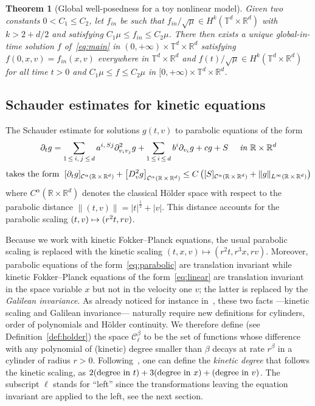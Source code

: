 \documentclass[10pt]{amsart}
\newtheorem{theo}{Theorem}[section]
\theoremstyle{definition}\newtheorem{defi}[theo]{Definition}\newtheorem{rema}[theo]{Remark}\newtheorem{exam}[theo]{Example}\newtheorem{exem}[theo]{Example}\newtheorem{nota}[theo]{Notation}
\newcommand{\R}{\mathbb{R}}
\newcommand{\T}{\mathbb{T}}
\newcommand{\cC}{\mathcal{C}}
\begin{document}
\begin{theo}[Global well-posedness for a toy nonlinear
model]\label{theo:main-holder}
Given two constants $0<C_1\le C_2$, let $f_{in}$ be such that $f_{in}/\sqrt{\mu} \in H^k(\T^d \times \R^{d})$ with $k > 2+d/2$ and satisfying $ C_1 \mu \le f_{in} \le C_2 \mu$. There then exists a unique global-in-time solution $f$ of~\eqref{eq:main} in $(0,+\infty) \times \T^d \times \R^d$ satisfying $f(0,x,v) = f_{in} (x,v)$ everywhere in $\T^d \times \R^{d}$ and $f(t)/\sqrt{\mu} \in H^k(\T^d \times \R^{d})$ for all time $t>0$ and $C_1 \mu \le f \le C_2 \mu$ in $[0,+\infty) \times \T^d \times \R^d$.
\end{theo}


\subsection{Schauder estimates for kinetic equations}

The Schauder estimate for solutions $g(t,v)$ to parabolic equations of the form
\begin{multline}\label{eq:parabolic}
\partial_t g =
\sum_{1\,\le\:i,\,j\:\le\,d} a^{i,\,Sj} \partial^2_{v_iv_j} g +
\sum_{1\,\le\,i\,\le\,d}b^i \partial_{v_i} g + c g + S \quad \emph{ in } \R \times \R^d \\[1ex]
\text{takes the form } \; [\partial_t g]_{\cC^{\alpha}\left(\R\,\times\,\R^d\right)} + \left[D^2_v g\right]_{\cC^\alpha\left(\R\,\times\,\R^d\right)} \le C
\left([S]_{\cC^\alpha\left(\R\,\times\,\R^d\right)} + \|g\|_{L^\infty\left(\R\,\times\,\R^d\right)} \right)
\end{multline}
where $C^\alpha (\R \times \R^d)$ denotes the classical H\"older space with respect to the parabolic distance $\|(t,v)\|=|t|^{\frac12} + |v|$. This distance accounts for the parabolic scaling $(t,v)\linebreak\mapsto (r^2t,rv)$.

Because we work with kinetic Fokker--Planck equations, the usual parabolic scaling is replaced with the kinetic scaling $(t,x,v) \mapsto (r^2t,r^3x,rv)$. Moreover, parabolic equations of the form~\eqref{eq:parabolic} are translation invariant while kinetic Fokker--Planck equations of the form~\eqref{eq:linear} are translation invariant in the space variable $x$ but not in the velocity one $v$; the latter is replaced by the \emph{Galilean invariance}. As already noticed for instance in~\cite{gimv,polidoro1994}, these two facts ---kinetic scaling and Galilean invariance--- naturally require new definitions for cylinders, order of polynomials and H\"older continuity. We therefore define (see Definition~\ref{def:holder}) the space $\cC^\beta_\ell$ to be the set of functions whose difference with any polynomial of (kinetic) degree smaller than $\beta$ decays at rate $r^\beta$ in a cylinder of radius $r>0$. Following~\cite{imbert2018schauder}, one can define the \emph{kinetic degree} that follows the kinetic scaling, as $2 (\text{degree in } t) + 3(\text{degree in } x)\linebreak+ (\text{degree in } v)$. The subscript $\ell$ stands for ``left'' since the transformations leaving the equation invariant are applied to the left, see the next section.
\end{document}
